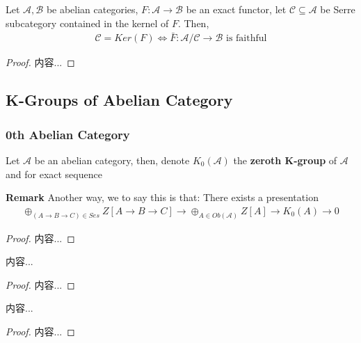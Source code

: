 \documentclass[Total.tex]{subfiles}
\begin{document}
						\begin{lemma}
							Let $\mathcal{A},\mathcal{B}$ be abelian categories, $F:\mathcal{A}\rightarrow \mathcal{B}$ be an exact functor, let $\mathcal{C}\subseteq \mathcal{A}$ be Serre subcategory contained in the kernel of $F$. Then,
							\begin{gather*}
								\mathcal{C}=Ker(F)\Leftrightarrow \bar{F}:\mathcal{A}/\mathcal{C}\rightarrow \mathcal{B}\mbox{ is faithful}
							\end{gather*}
						\end{lemma}
						\begin{proof}
							内容...
						\end{proof}
				\subsection{K-Groups of Abelian Category}
					\subsubsection{0th Abelian Category}
					\begin{Def}
						Let $\mathcal{A}$ be an abelian category, then, denote $K_0(\mathcal{A})$ the \textbf{zeroth K-group} of $\mathcal{A}$ and for exact sequence
					\end{Def}
					\textbf{Remark} Another way, we to say this is that: There exists a presentation
					\begin{gather*}
						\oplus_{(A\rightarrow B\rightarrow C)\in Ses} Z[A\rightarrow B\rightarrow C]\rightarrow \oplus_{A\in Ob(\mathcal{A})} Z[A]\rightarrow K_0(A)\rightarrow 0
					\end{gather*}
					\begin{lemma}
					\end{lemma}
					\begin{proof}
						内容...
					\end{proof}
					
					\begin{lemma}
						内容...
					\end{lemma}
					\begin{proof}
						内容...
					\end{proof}
					
					\begin{lemma}
						内容...
					\end{lemma}
					\begin{proof}
						内容...
					\end{proof}
\end{document}
